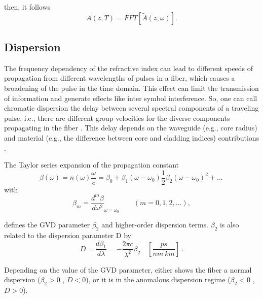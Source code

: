         then, it follows
        \begin{equation} \label{eq_deffft}
                A(z,T) = FFT \left[ \tilde{A}(z,\omega) \right].
            \end{equation}
            
            
    \subsection{Dispersion}
        The frequency dependency of the refractive index can lead to different speeds of propagation from different wavelengths of pulses in a fiber, which causes a broadening of the pulse in the time domain. This effect can limit the transmission of information and generate effects like inter symbol interference.  So, one can call chromatic dispersion the delay between several spectral components of a traveling pulse, i.e., there are different group velocities for the diverse components propagating in the fiber  \citep{Udayakumar2013ChromaticDC}. This delay depends on the waveguide (e.g., core radius) and material (e.g., the difference between core and cladding indices) contributions \citep{dudley_taylor_2010}. 
        
        The Taylor series expansion of the propagation constant 
        \begin{equation}
             \beta(\omega) = n (\omega)\frac{\omega}{c} = \beta_0 + \beta_1(\omega-\omega_0) \frac{1}{2}\beta_2(\omega-\omega_0)^2+...\, 
             \label{eq_betas}
        \end{equation}
        with 
        \begin{equation}
            \beta_m = \frac{d^m\beta}{d\omega^2}_{\omega = \omega_0} \qquad (m = 0,1,2,...),
            \label{eq_dbeta}
        \end{equation}
        
        
        defines the \gls{GVD} parameter $\beta_2$  and higher-order dispersion terms.  $\beta_2$ is also related to the dispersion parameter D by
        \begin{equation}
            D = \frac{d\beta_1}{d\lambda} = - \frac{2\pi c}{\lambda^2}\beta_2 \quad [\frac{ps}{nm \ km}] \ .
            \label{eq_Ds}
        \end{equation}
        
        Depending on the value of the GVD parameter, either shows the fiber a normal dispersion ($\beta_2 > 0$ , $D<0$), or it is in the anomalous dispersion regime ($\beta_2 < 0$ , $D>0$).
        
